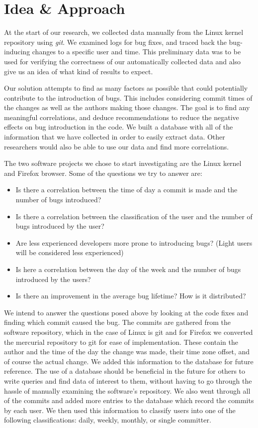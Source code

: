 \section{Idea \& Approach}
\label{sec-idea}

At the start of our research, we collected data manually from the
Linux kernel repository using {\em git}. We examined logs for bug
fixes, and traced back the bug-inducing changes to a specific user and
time. This preliminary data was to be used for verifying the
correctness of our automatically collected data and also give
us an idea of what kind of results to expect.

Our solution attempts to find as many factors as possible that could
potentially contribute to the introduction of bugs. This includes
considering commit times of the changes as well as the authors making
those changes. The goal is to find any meaningful correlations, and deduce
recommendations to reduce the negative effects on bug introduction in
the code. We built a database with all of the information that we have
collected in order to easily extract data. Other researchers would also
be able to use our data and find more correlations.

The two software projects we chose to start investigating are the Linux kernel and
Firefox browser. Some of the questions we try to answer are:
\begin{itemize}
\item
Is there a correlation between the time of day a commit is made and the number 
of bugs introduced?
\item
Is there a correlation between the classification of the user and the number 
of bugs introduced by the user?
\item
Are less experienced developers more prone to introducing bugs? (Light users will
be considered less experienced)
\item
Is here a correlation between the day of the week and the number of bugs
introduced by the users?
\item
Is there an improvement in the average bug lifetime? How is it distributed?
\end{itemize}

We intend to answer the questions posed above by looking at the code
fixes and finding which commit caused the bug. The commits are
gathered from the software repository, which in the case of Linux is
git and for Firefox we converted the mercurial repository to git for
ease of implementation. These contain the author and the time of the
day the change was made, their time zone offset, and of course the
actual change. We added this information to the database for future
reference. The use of a database should be beneficial in the future
for others to write queries and find data of interest to them, without
having to go through the hassle of manually examining the software's
repository. We also went through all of the commits and added more
entries to the database which record the commits by each user.  We
then used this information to classify users into one of the following
classifications: daily, weekly, monthly, or single committer.

